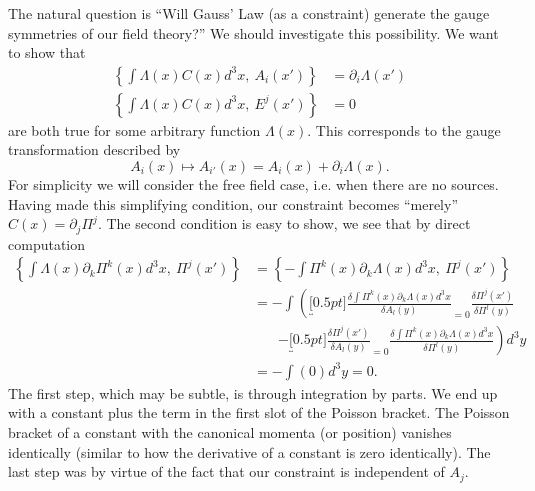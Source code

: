 The natural question is ``Will  Gauss' Law (as a constraint)
generate the gauge symmetries of our field theory?'' We should
investigate this possibility. We want to show that
\begin{subequations}
\begin{align}
\left\{\int \Lambda(x)C(x)d^{3}x,~ A_{i}(x')\right\} &= \partial_{i}\Lambda(x')\\
\left\{\int \Lambda(x)C(x)d^{3}x,~ E^{j}(x')\right\} &= 0
\end{align}
\end{subequations}
are both true for some arbitrary function $\Lambda(x)$. This
corresponds to the gauge transformation described by
\begin{equation}%
A_{i}(x)\mapsto A_{i'}(x) = A_{i}(x) + \partial_{i}\Lambda(x).
\end{equation}
For simplicity we will consider the free field case, i.e. when
there are no sources. Having made this simplifying condition, our
constraint becomes ``merely'' $C(x) = \partial_{j}\Pi^{j}$. The
second condition is easy to show, we see that by direct
computation
\begin{subequations}
\begin{align}
\left\{\int \Lambda(x)\partial_{k}\Pi^{k}(x)d^{3}x,~ \Pi^{j}(x')\right\}
&=\left\{-\int \Pi^{k}(x)\partial_{k}\Lambda(x)d^{3}x,~ \Pi^{j}(x')\right\}\\
&=-\int\left(\underbracket[0.5pt]{\frac{\delta\int \Pi^{k}(x)\partial_{k}\Lambda(x)d^{3}x}{\delta
  A_{l}(y)}}_{=0}\frac{\delta \Pi^{j}(x')}{\delta
  \Pi^{l}(y)}\right.\nonumber\\
&\phantom{-\int}\left. -\underbracket[0.5pt]{\frac{\delta \Pi^{j}(x')}{\delta
  A_{l}(y)}}_{=0}\frac{\delta \int
  \Pi^{k}(x)\partial_{k}\Lambda(x)d^{3}x}{\delta \Pi^{l}(y)}
\right) d^{3}y \\
&= -\int\left(0\right)d^{3}y = 0.
\end{align}
\end{subequations}
The first step, which may be subtle, is through integration by
parts. We end up with a constant plus the term in the first slot
of the Poisson bracket. The Poisson bracket of a constant with
the canonical momenta (or position) vanishes identically (similar
to how the derivative of a constant is zero identically). The
last step was by virtue of the fact that our constraint is
independent of $A_{j}$.

